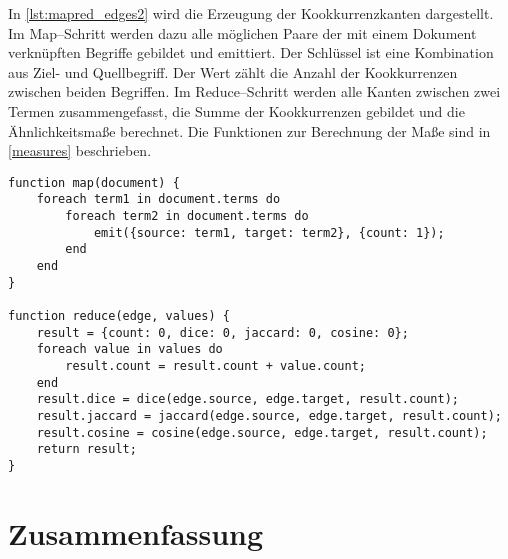 In \cref{lst:mapred_edges2} wird die Erzeugung der Kookkurrenzkanten dargestellt. Im Map--Schritt werden dazu alle möglichen Paare der mit einem Dokument verknüpften Begriffe gebildet und emittiert. Der Schlüssel ist eine Kombination aus Ziel- und Quellbegriff. Der Wert zählt die Anzahl der Kookkurrenzen zwischen beiden Begriffen. Im Reduce--Schritt werden alle Kanten zwischen zwei Termen zusammengefasst, die Summe der Kookkurrenzen gebildet und die Ähnlichkeitsmaße berechnet. Die Funktionen zur Berechnung der Maße sind in \cref{measures} beschrieben.

\begin{lstlisting}[language=pseudo, label={lst:mapred_edges2}, caption={Kantenerzeugung mit MapReduce}]
function map(document) {
    foreach term1 in document.terms do
        foreach term2 in document.terms do
            emit({source: term1, target: term2}, {count: 1});
        end
    end
}

function reduce(edge, values) {
    result = {count: 0, dice: 0, jaccard: 0, cosine: 0};
    foreach value in values do
        result.count = result.count + value.count;
    end
    result.dice = dice(edge.source, edge.target, result.count);
    result.jaccard = jaccard(edge.source, edge.target, result.count);
    result.cosine = cosine(edge.source, edge.target, result.count);
    return result;
}
\end{lstlisting}

\section{Zusammenfassung}
